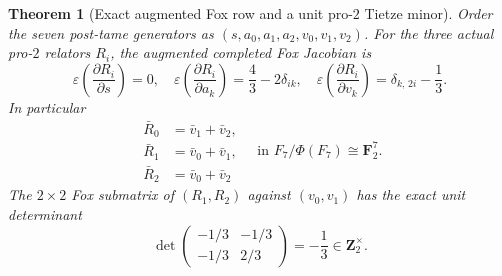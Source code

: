 \documentclass[11pt]{article}
\newtheorem{theorem}{Theorem}[section]
\theoremstyle{definition}
\begin{document}
\begin{theorem}[Exact augmented Fox row and a unit pro-$2$ Tietze minor]
\label{thm:dyadic-f133-primitive-wild-fox-minor}
Order the seven
post-tame generators
as
$(s,a_0,a_1,a_2,v_0,v_1,v_2)$.
For the three
\emph{actual}
pro-$2$ relators
$R_i$, the
augmented completed
Fox Jacobian is
\begin{equation}\label{eq:dyadic-f133-augmented-three-seven}
\boxed{
\varepsilon\!\left(
\frac{\partial R_i}
     {\partial s}\right)=0,
\quad
\varepsilon\!\left(
\frac{\partial R_i}
     {\partial a_k}\right)
=\frac43-2\delta_{ik},
\quad
\varepsilon\!\left(
\frac{\partial R_i}
     {\partial v_k}\right)
=\delta_{k,\,2i}-\frac13.
}
\end{equation}
In particular
\begin{equation}\label{eq:dyadic-f133-wild-modtwo-relations}
\boxed{
\begin{aligned}
\bar R_0&=\bar v_1+\bar v_2,\\
\bar R_1&=\bar v_0+\bar v_1,\\
\bar R_2&=\bar v_0+\bar v_2
\end{aligned}
\quad
\text{in }F_7/\Phi(F_7)
\cong\mathbf F_2^7.
}
\end{equation}
The $2\times2$
Fox submatrix of
$(R_1,R_2)$ against
$(v_0,v_1)$ has
the exact unit
determinant
\begin{equation}\label{eq:dyadic-f133-wild-nielsen-unit}
\boxed{
\det
\begin{pmatrix}
-1/3&-1/3\\
-1/3&2/3
\end{pmatrix}
=-\frac13
\in\mathbf Z_2^\times.
}
\end{equation}


\end{theorem}
\end{document}
